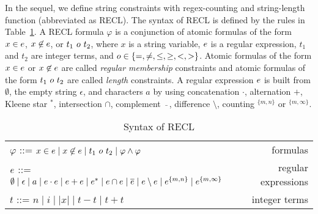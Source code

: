 %

In the sequel, we define string constraints with regex-counting and string-length function (abbreviated as RECL). The syntax of RECL is defined by the rules in Table~\ref{tab:syntax}. 
A RECL formula $\varphi$ is a conjunction of atomic formulas of the form $x \in e$, $x \not \in e$, or $t_1\ \op\ t_2$, where $x$ is a string variable, $e$ is a regular expression,  
$t_1$ and $t_2$ are integer terms, and $o \in \{=, \neq, \le, \ge, <, >\}$. Atomic formulas of the form $x \in e$ or $x \not \in e$ are called \emph{regular membership} constraints and atomic formulas of the form $t_1\ \op\ t_2$ are called \emph{length} constraints. 
%
A regular expression $e$ is built from $\emptyset$, the empty string $\epsilon$, and characters $a$ by using concatenation  $\cdot$, alternation $+$, Kleene star $^*$, intersection $\cap$, complement $\bar{\mbox{ }}$, difference $\setminus$, counting $^{\{m,n\}}$ or $^{\{m,\infty\}}$. 
% 
\begin{table}[h]
  \centering
  \begin{tabular}{l r}
    $\varphi$ ::= $x\in e \mid x \not \in e \mid t_1\  o\ t_2 \mid  \varphi \wedge \varphi $                                             & formulas            \\
    $e$ ::= $\emptyset \mid \epsilon \mid a \mid e\cdot e \mid e+e \mid e^* \mid e \cap e \mid \overline{e} \mid e \setminus e \mid e^{\{m,n\}} \mid e^{\{m,\infty\}}$ & regular expressions \\
    $t$ ::= $n \mid i \mid  |x| \mid t - t \mid t + t$                                                                       & integer terms
  \end{tabular}
  \caption{Syntax of RECL }\label{tab:syntax}
\end{table}

